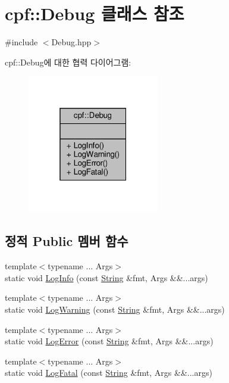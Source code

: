 \hypertarget{classcpf_1_1_debug}{}\section{cpf\+:\+:Debug 클래스 참조}
\label{classcpf_1_1_debug}


{\ttfamily \#include $<$Debug.\+hpp$>$}



cpf\+:\+:Debug에 대한 협력 다이어그램\+:\nopagebreak
\begin{figure}[H]
\begin{center}
\leavevmode
\includegraphics[width=163pt]{classcpf_1_1_debug__coll__graph}
\end{center}
\end{figure}
\subsection*{정적 Public 멤버 함수}
\begin{DoxyCompactItemize}
\item 
{\footnotesize template$<$typename ... Args$>$ }\\static void \hyperlink{classcpf_1_1_debug_a4fdb5fd97498bef70585fcac8047efa2}{Log\+Info} (const \hyperlink{namespacecpf_a4dbd6992c3ed4440ce7ed8982ff7ffea}{String} \&fmt, Args \&\&...args)
\item 
{\footnotesize template$<$typename ... Args$>$ }\\static void \hyperlink{classcpf_1_1_debug_a57373c6a7f52d7d41282596e2eb7d901}{Log\+Warning} (const \hyperlink{namespacecpf_a4dbd6992c3ed4440ce7ed8982ff7ffea}{String} \&fmt, Args \&\&...args)
\item 
{\footnotesize template$<$typename ... Args$>$ }\\static void \hyperlink{classcpf_1_1_debug_a3c867b9c24006a8b45b661b35efea6d2}{Log\+Error} (const \hyperlink{namespacecpf_a4dbd6992c3ed4440ce7ed8982ff7ffea}{String} \&fmt, Args \&\&...args)
\item 
{\footnotesize template$<$typename ... Args$>$ }\\static void \hyperlink{classcpf_1_1_debug_a22849847c74bcb444922c263c9ae6183}{Log\+Fatal} (const \hyperlink{namespacecpf_a4dbd6992c3ed4440ce7ed8982ff7ffea}{String} \&fmt, Args \&\&...args)
\end{DoxyCompactItemize}


